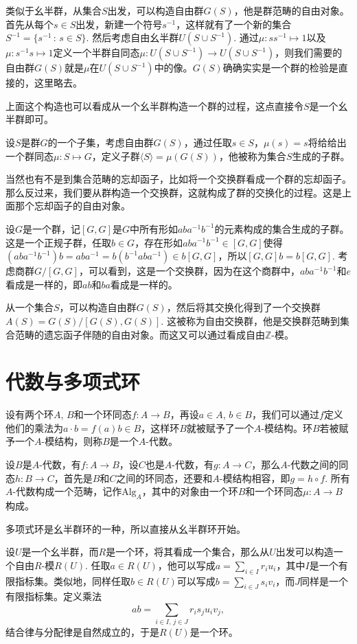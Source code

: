 \para 类似于幺半群，从集合$S$出发，可以构造自由群$G(S)$，他是群范畴的自由对象。首先从每个$s\in S$出发，新建一个符号$s^{-1}$，这样就有了一个新的集合$S^{-1}=\{s^{-1}\,:\, s\in S\}$. 然后考虑自由幺半群$U(S\cup S^{-1})$. 通过$\mu: ss^{-1}\mapsto 1$以及$\mu: s^{-1}s\mapsto 1$定义一个半群自同态$\mu:U(S\cup S^{-1})\to U(S\cup S^{-1})$，则我们需要的自由群$G(S)$就是$\mu$在$U(S\cup S^{-1})$中的像。$G(S)$确确实实是一个群的检验是直接的，这里略去。

上面这个构造也可以看成从一个幺半群构造一个群的过程，这点直接令$S$是一个幺半群即可。

\para 设$S$是群$G$的一个子集，考虑自由群$G(S)$，通过任取$s\in S$，$\mu(s)=s$将给给出一个群同态$\mu:S\mapsto G$，定义子群$\langle S\rangle=\mu(G(S))$，他被称为集合$S$生成的子群。

\para 当然也有不是到集合范畴的忘却函子，比如将一个交换群看成一个群的忘却函子。那么反过来，我们要从群构造一个交换群，这就构成了群的交换化的过程。这是上面那个忘却函子的自由对象。

设$G$是一个群，记$[G,G]$是$G$中所有形如$aba^{-1}b^{-1}$的元素构成的集合生成的子群。这是一个正规子群，任取$b\in G$，存在形如$aba^{-1}b^{-1}\in [G,G]$使得$(aba^{-1}b^{-1})b=aba^{-1}=b(b^{-1}aba^{-1})\in b[G,G]$，所以$[G,G]b=b[G,G]$. 考虑商群$G/[G,G]$，可以看到，这是一个交换群，因为在这个商群中，$aba^{-1}b^{-1}$和$e$看成是一样的，即$ab$和$ba$看成是一样的。

从一个集合$S$，可以构造自由群$G(S)$，然后将其交换化得到了一个交换群$A(S)=G(S)/[G(S),G(S)]$. 这被称为自由交换群，他是交换群范畴到集合范畴的遗忘函子伴随的自由对象。而这又可以通过看成自由$\mathbb{Z}$-模。

\section{代数与多项式环}

设有两个环$A$, $B$和一个环同态$f:A\to B$，再设$a\in A$, $b\in B$，我们可以通过$f$定义他们的乘法为$a\cdot b=f(a)b\in B$，这样环$B$就被赋予了一个$A$-模结构。环$B$若被赋予一个$A$-模结构，则称$B$是一个$A$-代数。

设$B$是$A$-代数，有$f:A\to B$，设$C$也是$A$-代数，有$g:A\to C$，那么$A$-代数之间的同态$h:B\to C$，首先是$B$和$C$之间的环同态，还要和$A$-模结构相容，即$g=h\circ f$. 所有$A$-代数构成一个范畴，记作$\mathrm{Alg}_A$，其中的对象由一个环$B$和一个环同态$\mu:A\to B$构成。

多项式环是幺半群环的一种，所以直接从幺半群环开始。

\para 设$U$是一个幺半群，而$R$是一个环，将其看成一个集合，那么从$U$出发可以构造一个自由$R$-模$R(U)$. 任取$a\in R(U)$，他可以写成$a=\sum_{i\in I} r_i u_i$，其中$I$是一个有限指标集。类似地，同样任取$b\in R(U)$可以写成$b=\sum_{i\in J} s_i v_i$，而$J$同样是一个有限指标集。定义乘法
\[
	ab=\sum_{i\in I,\, j\in J}r_is_j u_i v_j,
\]
结合律与分配律是自然成立的，于是$R(U)$是一个环。

